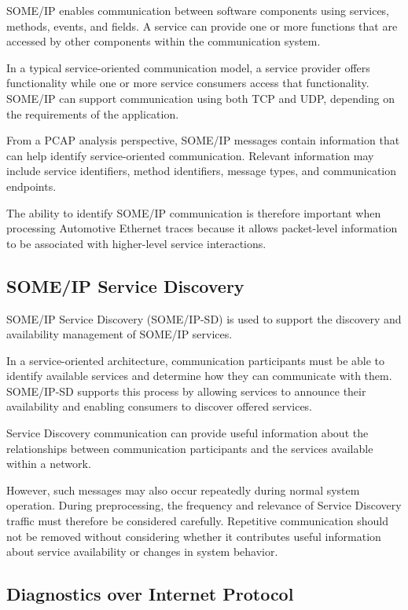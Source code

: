 SOME/IP enables communication between software components using services, methods, events, and fields. A service can provide one or more functions that are accessed by other components within the communication system.

In a typical service-oriented communication model, a service provider offers functionality while one or more service consumers access that functionality. SOME/IP can support communication using both TCP and UDP, depending on the requirements of the application.

From a PCAP analysis perspective, SOME/IP messages contain information that can help identify service-oriented communication. Relevant information may include service identifiers, method identifiers, message types, and communication endpoints.

The ability to identify SOME/IP communication is therefore important when processing Automotive Ethernet traces because it allows packet-level information to be associated with higher-level service interactions.

\subsection{SOME/IP Service Discovery}

SOME/IP Service Discovery (SOME/IP-SD) is used to support the discovery and availability management of SOME/IP services.

In a service-oriented architecture, communication participants must be able to identify available services and determine how they can communicate with them. SOME/IP-SD supports this process by allowing services to announce their availability and enabling consumers to discover offered services.

Service Discovery communication can provide useful information about the relationships between communication participants and the services available within a network.

However, such messages may also occur repeatedly during normal system operation. During preprocessing, the frequency and relevance of Service Discovery traffic must therefore be considered carefully. Repetitive communication should not be removed without considering whether it contributes useful information about service availability or changes in system behavior.

\subsection{Diagnostics over Internet Protocol}

